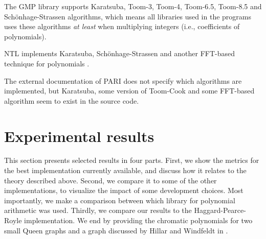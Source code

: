 \documentclass[a4paper]{article}
\begin{document}


The GMP library supports Karatsuba, Toom-3, Toom-4, Toom-6.5, Toom-8.5 and Schönhage-Strassen \cite[p 90]{gmp} algorithms, which means all libraries used in the programs uses these algorithms \emph{at least} when multiplying integers (i.e., coefficients of polynomials).

NTL implements Karatsuba, Schönhage-Strassen and another FFT-based technique for polynomials \cite{ntl_zzx}.

The external documentation of PARI does not specify which algorithms are implemented, but Karatsuba, some version of Toom-Cook and some FFT-based algorithm seem to exist in the source code.


\section{Experimental results}
This section presents selected results in four parts. First, we show the metrics for the best implementation currently available, and discuss how it relates to the theory described above. Second, we compare it to some of the other implementations, to visualize the impact of some development choices. Most importantly, we make a comparison between which library for polynomial arithmetic was used. Thirdly, we compare our results to the Haggard-Pearce-Royle implementation.
We end by providing the chromatic polynomials for two small Queen graphs and a graph discussed by Hillar and Windfeldt in \cite{hillar_windfeldt}. 
\end{document}
